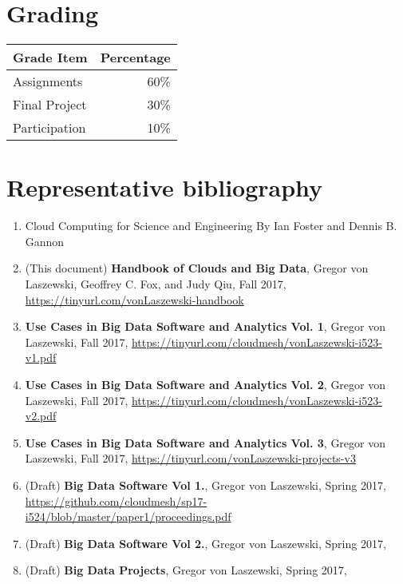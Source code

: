 \section{Grading}

\begin{tabular}{lr}
  Grade Item	  & Percentage\\
  \toprule
  Assignments	  & 60\%\\
  Final Project	& 30\%\\
  Participation	& 10\%\\
  \bottomrule
\end{tabular}


\section{Representative bibliography}

\begin{enumerate}

\item Cloud Computing for Science and Engineering By Ian Foster and
  Dennis
  B. Gannon


\item (This document) {\bf Handbook of Clouds and Big Data}, Gregor von Laszewski,
  Geoffrey C. Fox, and Judy Qiu, Fall 2017,
  \url{https://tinyurl.com/vonLaszewski-handbook}

\item {\bf Use Cases in Big Data Software and
  Analytics Vol. 1}, Gregor von Laszewski, Fall 2017,
  \url{https://tinyurl.com/cloudmesh/vonLaszewski-i523-v1.pdf}

\item {\bf Use Cases in Big Data Software and
  Analytics Vol. 2}, Gregor von Laszewski, Fall 2017, \url{https://tinyurl.com/cloudmesh/vonLaszewski-i523-v2.pdf}

\item  {\bf Use Cases in Big Data Software and
  Analytics Vol. 3}, Gregor von Laszewski, Fall 2017, 
  \url{https://tinyurl.com/vonLaszewski-projects-v3}


\item (Draft) {\bf Big Data Software Vol 1.}, Gregor von Laszewski, Spring 2017,
\url{https://github.com/cloudmesh/sp17-i524/blob/master/paper1/proceedings.pdf}

\item (Draft) {\bf Big Data Software Vol 2.}, Gregor von Laszewski, Spring 2017,

\item (Draft) {\bf Big Data Projects}, Gregor von Laszewski, Spring 2017,

\end{enumerate}


